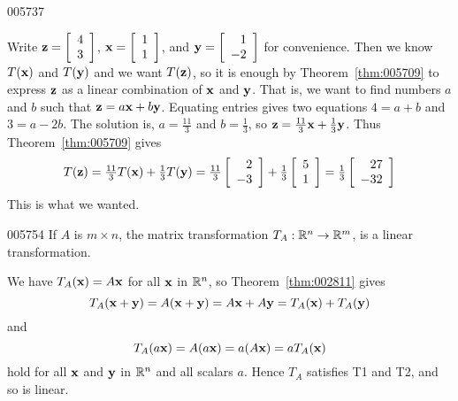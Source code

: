 \begin{example}{}{005737}
\begin{solution}
  Write $\textbf{z} = \left[ \begin{array}{r}
  4 \\
  3
  \end{array} \right]$, $\textbf{x} = \left[ \begin{array}{r}
  1 \\
  1
  \end{array} \right]$, and $\textbf{y} = \left[ \begin{array}{r}
 1 \\
 -2
 \end{array} \right]$
 for convenience. Then we know $T(\textbf{x})$ and $T(\textbf{y})$ and we want $T(\textbf{z})$, so it is enough by Theorem~\ref{thm:005709} to express $\textbf{z}$ as a linear combination of $\textbf{x}$ and $\textbf{y}$. That is, we want to find numbers $a$ and $b$ such that $\textbf{z} = a\textbf{x} + b\textbf{y}$. Equating entries gives two equations $4 = a + b$ and $3 = a - 2b$. The solution is, $a = \frac{11}{3}$
 and $b = \frac{1}{3}$, so $\textbf{z} = \tfrac{11}{3}\textbf{x} + \tfrac{1}{3}\textbf{y}$.
 Thus Theorem~\ref{thm:005709} gives
\begin{equation*}
T(\textbf{z}) = \tfrac{11}{3}T(\textbf{x}) + \tfrac{1}{3}T(\textbf{y}) = \tfrac{11}{3} \left[ \begin{array}{r}
2 \\
-3
\end{array} \right] + \tfrac{1}{3} \left[ \begin{array}{r}
5 \\
1
\end{array} \right] = \tfrac{1}{3} \left[ \begin{array}{r}
27 \\
-32
\end{array} \right]
\end{equation*}
This is what we wanted.
\end{solution}
\end{example}

\begin{example}{}{005754}
If $A$ is $m \times n$, the matrix transformation $T_{A} : \mathbb{R}^n \to \mathbb{R}^m$, is a linear transformation.

\begin{solution}
  We have $T_{A}(\textbf{x}) = A\textbf{x}$ for all $\textbf{x}$ in $\mathbb{R}^n$, so Theorem~\ref{thm:002811} gives
\begin{equation*}
T_{A}(\textbf{x} + \textbf{y}) = A(\textbf{x} + \textbf{y}) = A\textbf{x} + A\textbf{y} = T_{A}(\textbf{x}) + T_{A}(\textbf{y})
\end{equation*}
and
\begin{equation*}
T_{A}(a\textbf{x}) = A(a\textbf{x}) = a(A\textbf{x}) = aT_{A}(\textbf{x})
\end{equation*}
hold for all $\textbf{x}$ and $\textbf{y}$ in $\mathbb{R}^n$ and all scalars $a$. Hence $T_{A}$ satisfies T1 and T2, and so is linear.
\end{solution}
\end{example}

